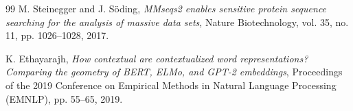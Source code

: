 \begin{thebibliography}{99}
M. Steinegger and J. S\"oding,
\textit{MMseqs2 enables sensitive protein sequence searching for the analysis of massive data sets},
Nature Biotechnology, vol. 35, no. 11, pp. 1026--1028, 2017.

K. Ethayarajh,
\textit{How contextual are contextualized word representations? Comparing the geometry of BERT, ELMo, and GPT-2 embeddings},
Proceedings of the 2019 Conference on Empirical Methods in Natural Language Processing (EMNLP), pp. 55--65, 2019.

\end{thebibliography}
\endgroup

\clearpage
